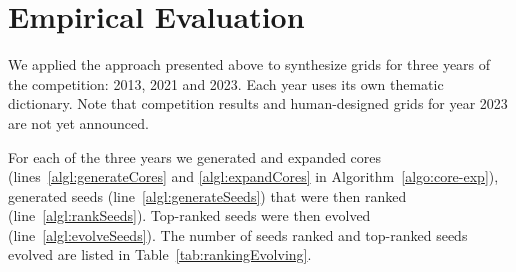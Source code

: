 \section{Empirical Evaluation}

We applied the approach presented above to synthesize grids for three years of the competition: 2013, 2021 and 2023. Each year uses its own thematic dictionary. Note that competition results and human-designed grids for year 2023 are not yet announced.

For each of the three years we generated and expanded cores (lines~\ref{algl:generateCores} and \ref{algl:expandCores} in Algorithm~\ref{algo:core-exp}), generated seeds (line~\ref{algl:generateSeeds}) that were then ranked (line~\ref{algl:rankSeeds}). Top-ranked seeds were then evolved (line~\ref{algl:evolveSeeds}). The number of seeds ranked and top-ranked seeds evolved are listed in Table~\ref{tab:rankingEvolving}.


